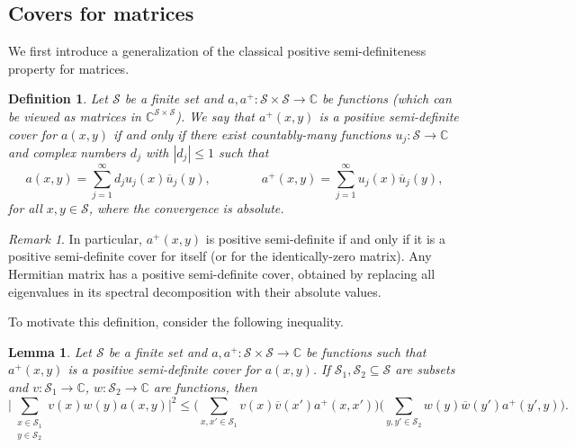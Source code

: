 \documentclass[11pt]{amsart}
\newtheorem{lemma}[theorem]{Lemma}
\newtheorem{definition}[theorem]{Definition}
\theoremstyle{remark}
\newtheorem*{remark}{Remark}
\numberwithin{equation}{section}
\newcommand{\mS}{\mathcal{S}}
\renewcommand{\bar}{\overline}
\begin{document}
\subsection{Covers for matrices}

We first introduce a generalization of the classical positive semi-definiteness property for matrices.

\begin{definition}
\label{def:covers-bilinear-forms}
    Let $\mS$ be a finite set and $a, a^+\colon \mS \times \mS \to \mathbb{C}$ be functions (which can be viewed as matrices in $\mathbb{C}^{\mS \times \mS}$). We say that $a^+(x, y)$ is a \emph{positive semi-definite cover} for $a(x, y)$ if and only if there exist countably-many functions $u_j\colon \mS \to \mathbb{C}$ and complex numbers $d_j$ with $|d_j| \le 1$ such that
    \begin{equation} \label{eqn:covers-bilinear-forms}
        a(x, y) = \sum_{j=1}^\infty d_j u_j(x) \bar u_j(y),
        \qquad\qquad 
        a^+(x, y) = \sum_{j=1}^\infty u_j(x) \bar u_j(y),
    \end{equation}
    for all $x, y \in \mS$, where the convergence is absolute.
\end{definition}

\begin{remark}
In particular, $a^+(x, y)$ is positive semi-definite if and only if it is a positive semi-definite cover for itself (or for the identically-zero matrix). Any Hermitian matrix has a positive semi-definite cover, obtained by replacing all eigenvalues in its spectral decomposition with their absolute values.
\end{remark}


To motivate this definition, consider the following inequality.

\begin{lemma} \label{lem:inequality-bilinear-forms}
Let $\mS$ be a finite set and $a, a^+\colon \mS \times \mS \to \mathbb{C}$ be functions such that $a^+(x, y)$ is a positive semi-definite cover for $a(x, y)$.  If $\mS_1, \mS_2 \subseteq \mS$ are subsets and $v\colon \mS_1 \to \mathbb{C}$, $w\colon \mS_2 \to \mathbb{C}$ are functions, then
\[
    \Bigg| \sum_{\substack{x \in \mS_1 \\ y \in \mS_2}} v(x)w(y) a(x, y) \Bigg|^2
    \le 
    \Bigg(\sum_{x, x' \in \mS_1} v(x)\bar v(x')a^+(x, x')\Bigg) \Bigg(\sum_{y,y' \in \mS_2} w(y) \bar w(y') a^+(y', y)\Bigg).
\]
\end{lemma}
\end{document}
